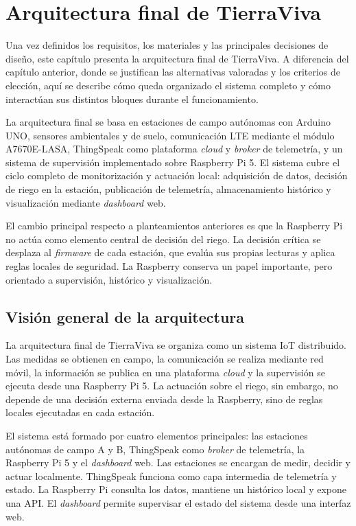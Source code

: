 \chapter{Arquitectura final de TierraViva}
\label{cap:capitulo4}

Una vez definidos los requisitos, los materiales y las principales decisiones de diseño, este capítulo presenta la arquitectura final de TierraViva. A diferencia del capítulo anterior, donde se justifican las alternativas valoradas y los criterios de elección, aquí se describe cómo queda organizado el sistema completo y cómo interactúan sus distintos bloques durante el funcionamiento.

La arquitectura final se basa en estaciones de campo autónomas con Arduino UNO, sensores ambientales y de suelo, comunicación LTE mediante el módulo A7670E-LASA, ThingSpeak como plataforma \textit{cloud} y \textit{broker} de telemetría, y un sistema de supervisión implementado sobre Raspberry Pi 5. El sistema cubre el ciclo completo de monitorización y actuación local: adquisición de datos, decisión de riego en la estación, publicación de telemetría, almacenamiento histórico y visualización mediante \textit{dashboard} web.

El cambio principal respecto a planteamientos anteriores es que la Raspberry Pi no actúa como elemento central de decisión del riego. La decisión crítica se desplaza al \textit{firmware} de cada estación, que evalúa sus propias lecturas y aplica reglas locales de seguridad. La Raspberry conserva un papel importante, pero orientado a supervisión, histórico y visualización.

\section{Visión general de la arquitectura}
\label{sec:vision_general_arquitectura}

La arquitectura final de TierraViva se organiza como un sistema IoT distribuido. Las medidas se obtienen en campo, la comunicación se realiza mediante red móvil, la información se publica en una plataforma \textit{cloud} y la supervisión se ejecuta desde una Raspberry Pi 5. La actuación sobre el riego, sin embargo, no depende de una decisión externa enviada desde la Raspberry, sino de reglas locales ejecutadas en cada estación.

El sistema está formado por cuatro elementos principales: las estaciones autónomas de campo A y B, ThingSpeak como \textit{broker} de telemetría, la Raspberry Pi 5 y el \textit{dashboard} web. Las estaciones se encargan de medir, decidir y actuar localmente. ThingSpeak funciona como capa intermedia de telemetría y estado. La Raspberry Pi consulta los datos, mantiene un histórico local y expone una API. El \textit{dashboard} permite supervisar el estado del sistema desde una interfaz web.

